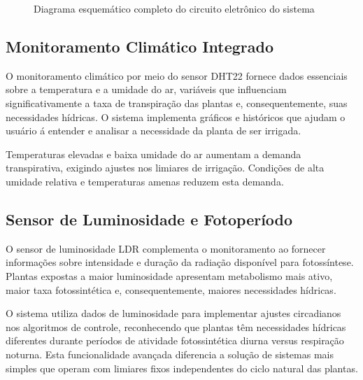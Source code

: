 \documentclass[twoside,english,brazilian]{UNISINOSmonografia}
\begin{document}
\begin{figure}[htbp]
\centering
\caption{Diagrama esquemático completo do circuito eletrônico do sistema}
\label{fig:esquema_circuito}
\end{figure}

\subsection{Monitoramento Climático Integrado}

O monitoramento climático por meio do sensor DHT22 fornece dados essenciais sobre a temperatura e a umidade do ar, variáveis que influenciam significativamente a taxa de transpiração das plantas e, consequentemente, suas necessidades hídricas. O sistema implementa gráficos e históricos que ajudam o usuário á entender e analisar a necessidade da planta de ser irrigada.

Temperaturas elevadas e baixa umidade do ar aumentam a demanda transpirativa, exigindo ajustes nos limiares de irrigação. Condições de alta umidade relativa e temperaturas amenas reduzem esta demanda.

\subsection{Sensor de Luminosidade e Fotoperíodo}

O sensor de luminosidade LDR complementa o monitoramento ao fornecer informações sobre intensidade e duração da radiação disponível para fotossíntese. Plantas expostas a maior luminosidade apresentam metabolismo mais ativo, maior taxa fotossintética e, consequentemente, maiores necessidades hídricas.

O sistema utiliza dados de luminosidade para implementar ajustes circadianos nos algoritmos de controle, reconhecendo que plantas têm necessidades hídricas diferentes durante períodos de atividade fotossintética diurna versus respiração noturna. Esta funcionalidade avançada diferencia a solução de sistemas mais simples que operam com limiares fixos independentes do ciclo natural das plantas.
\end{document}
